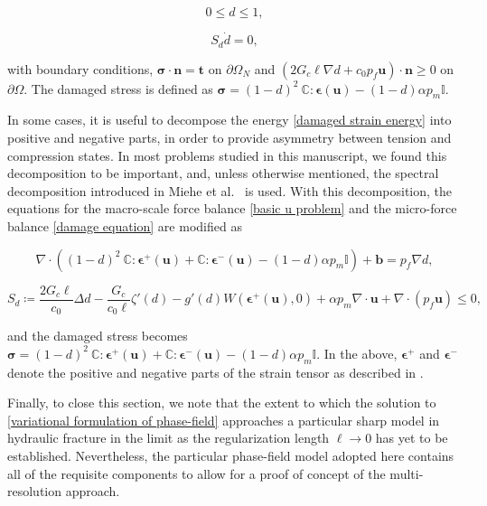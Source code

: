 \begin{equation}
   0 \le d \le 1,
\end{equation}

\begin{equation}
    S_d\dot{d} = 0,
    \label{eq:ddot-strong}
\end{equation}

with boundary conditions, $\boldsymbol\sigma \cdot \textbf{n} = \textbf{t}$ on $\partial \Omega_N$ and $(2G_c\ell\nabla d +c_0p_f\textbf{u})\cdot \textbf{n} \ge 0$ on $\partial \Omega$. The damaged stress is defined as $\boldsymbol\sigma = (1-d)^2\ \mathbb{C}:\boldsymbol\epsilon(\textbf{u}) -(1-d)\alpha p_m \mathbb{I}$.

In some cases, it is useful to decompose the energy \eqref{damaged strain energy} into positive and negative parts, in order to provide asymmetry between tension and compression states. In most problems studied in this manuscript, we found this decomposition to be important, and, unless otherwise mentioned, the spectral decomposition introduced in Miehe et al.~\cite{miehe2010phase} is used. With this decomposition, the equations for the macro-scale force balance \eqref{basic u problem} and the micro-force balance \eqref{damage equation} are modified as

\begin{equation}\label{basic u problem spectral}\tag{22a}
    \nabla \cdot \left( (1-d)^2\ \mathbb{C}:\boldsymbol\epsilon^+(\textbf{u}) + \mathbb{C}:\boldsymbol\epsilon^-(\textbf{u})-(1-d)\alpha p_m \mathbb{I}\right) + \textbf{b} = p_f\nabla d, 
\end{equation}

\begin{equation}\label{damage equation spectral}\tag{23a}
    S_d \coloneqq  \dfrac{2G_c\ell}{c_0}\Delta d - \dfrac{G_c}{c_0\ell}\zeta'(d)-g'(d)W(\boldsymbol{\epsilon^+}(\boldsymbol{\textbf{u}}),0) + \alpha p_m\nabla \cdot \textbf{u} + \nabla \cdot (p_f\textbf{u}) \le 0,
\end{equation}

and the damaged stress becomes $\boldsymbol\sigma = (1-d)^2\ \mathbb{C}:\boldsymbol\epsilon^+(\textbf{u}) + \mathbb{C}:\boldsymbol\epsilon^-(\textbf{u})-(1-d)\alpha p_m \mathbb{I}$. In the above, $\boldsymbol\epsilon^+$ and $\boldsymbol\epsilon^-$ denote the positive and negative parts of the strain tensor as described in \cite{miehe2010phase}. 

Finally, to close this section, we note that the extent to which the solution to \eqref{variational formulation of phase-field} approaches a particular sharp model in hydraulic fracture in the limit as the regularization length $\ell\rightarrow 0$ has yet to be established.  Nevertheless, the particular phase-field model adopted here contains all of the requisite components to allow for a proof of concept of the multi-resolution approach.  




